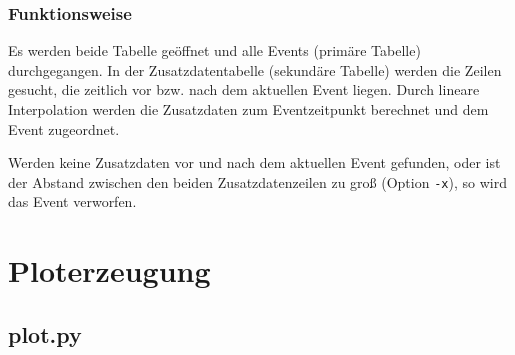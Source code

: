 \documentclass[version=last,
	a4paper,			%
	pagesize, 			%
	11pt,				%
	BCOR1cm,			%
	DIV12,	 			%
	pointlessnumbers,   %
	halfparskip,		%
]{scrreprt}
\begin{document}
\subsection{Funktionsweise}
Es werden beide Tabelle geöffnet und alle Events (primäre Tabelle) durchgegangen. In der Zusatzdatentabelle (sekundäre Tabelle) werden die Zeilen gesucht, die zeitlich vor bzw. nach dem aktuellen Event liegen. Durch lineare Interpolation werden die Zusatzdaten zum Eventzeitpunkt berechnet und dem Event zugeordnet.

Werden keine Zusatzdaten vor und nach dem aktuellen Event gefunden, oder ist der Abstand zwischen den beiden Zusatzdatenzeilen zu groß (Option \texttt{-x}), so wird das Event verworfen.










\chapter{Ploterzeugung}
\section{plot.py}
\end{document}
